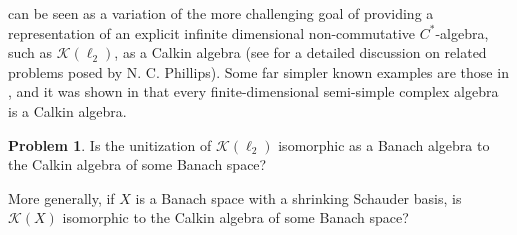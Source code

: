 \documentclass[11pt]{amsart}
\theoremstyle{definition}
\newtheorem{problem}{Problem}
\numberwithin{equation}{section}
\begin{document}
 can be seen as a variation of the more challenging goal of providing a representation of an explicit infinite dimensional non-commutative $C^*$-algebra, such as $\mathcal{K}(\ell_2)$, as a  Calkin algebra (see \cite[Section 9]{motakis:2024} for a detailed discussion on related problems posed by N. C. Phillips). Some far simpler known examples are those in \cite[Corollary 8.8]{motakis:2024}, and it was shown in \cite{kania:laustsen:2017} that every finite-dimensional semi-simple complex algebra is a Calkin algebra. 

\begin{problem}
Is the unitization of $\mathcal{K}(\ell_2)$ isomorphic as a Banach algebra to the Calkin algebra of some Banach space?
\end{problem}

More generally, if $X$ is a Banach space with a shrinking Schauder basis, is $\mathcal{K}(X)$ isomorphic to the Calkin algebra of some Banach space?






\end{document}
